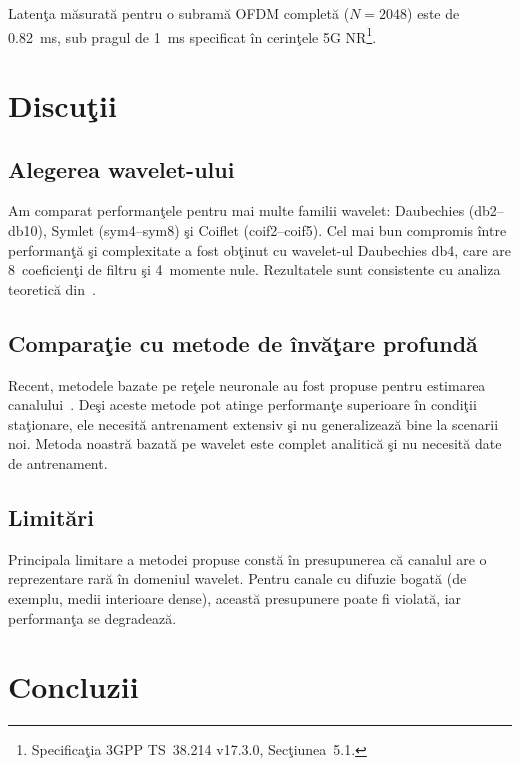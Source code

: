 \documentclass[12pt,a4paper]{article}
\begin{document}
Latenţa măsurată pentru o subramă OFDM completă ($N = 2048$)
este de \SI{0.82}{\milli\second}, sub pragul de \SI{1}{\milli\second}
specificat în cerinţele 5G NR\footnote{%
Specificaţia 3GPP TS~38.214 v17.3.0, Secţiunea~5.1.}.

\section{Discuţii}
\label{sec:discutii}

\subsection{Alegerea wavelet-ului}

Am comparat performanţele pentru mai multe familii wavelet:
Daubechies (db2--db10), Symlet (sym4--sym8) şi Coiflet (coif2--coif5).
Cel mai bun compromis între performanţă şi complexitate a fost obţinut
cu wavelet-ul Daubechies db4, care are 8~coeficienţi de filtru şi
4~momente nule. Rezultatele sunt consistente cu analiza teoretică
din~\citet{mallat2009}.

\subsection{Comparaţie cu metode de învăţare profundă}

Recent, metodele bazate pe reţele neuronale au fost propuse pentru
estimarea canalului~\citep{ye2018}. Deşi aceste metode pot atinge
performanţe superioare în condiţii staţionare, ele necesită
antrenament extensiv şi nu generalizează bine la scenarii noi.
Metoda noastră bazată pe wavelet este complet analitică şi nu necesită
date de antrenament.

\subsection{Limitări}

Principala limitare a metodei propuse constă în presupunerea că
canalul are o reprezentare rară în domeniul wavelet. Pentru canale
cu difuzie bogată (de exemplu, medii interioare dense), această
presupunere poate fi violată, iar performanţa se degradează.

\section{Concluzii}
\label{sec:concluzii}
\end{document}
